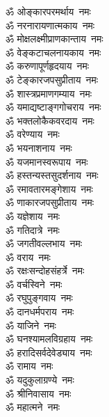 \begin{multicols}{2}
    \begin{flushleft}
        ॐ ओङ्कारपरमर्थाय~नमः\\
        ॐ नरनारायणात्मकाय~नमः\\
        ॐ मोक्षलक्ष्मीप्राणकान्ताय~नमः\\
        ॐ वेङ्कटाचलनायकाय~नमः\\
        ॐ करुणापूर्णहृदयाय~नमः\\
        ॐ टेङ्कारजपसुप्रीताय~नमः\\
        ॐ शास्त्रप्रमाणगम्याय~नमः\\
        ॐ यमाद्यष्टाङ्गगोचराय~नमः\\
        ॐ भक्तलोकैकवरदाय~नमः\\
        ॐ वरेण्याय~नमः\hfill{}\\
                                                        
        ॐ भयनाशनाय~नमः\\
        ॐ यजमानस्वरूपाय~नमः\\
        ॐ हस्तन्यस्तसुदर्शनाय~नमः\\
        ॐ रमावतारमङ्गेशाय~नमः\\
        ॐ णाकारजपसुप्रीताय~नमः\\
        ॐ यज्ञेशाय~नमः\\
        ॐ गतिदात्रे~नमः\\
        ॐ जगतीवल्लभाय~नमः\\
        ॐ वराय~नमः\\
        ॐ रक्षःसन्दोहसंहर्त्रे~नमः\hfill{}\\
                                                        
        ॐ वर्चस्विने~नमः\\
        ॐ रघुपुङ्गवाय~नमः\\
        ॐ दानधर्मपराय~नमः\\
        ॐ याजिने~नमः\\
        ॐ घनश्यामलविग्रहाय~नमः\\
        ॐ हरादिसर्वदेवेड्याय~नमः\\
        ॐ रामाय~नमः\\
        ॐ यदुकुलाग्रण्ये~नमः\\
        ॐ श्रीनिवासाय~नमः\\
        ॐ महात्मने~नमः\hfill{}\\
                                                        

\end{flushleft}
\end{multicols}
